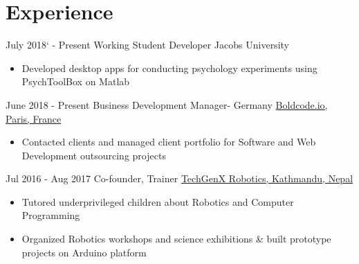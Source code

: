 \documentclass[letterpaper]{twentysecondcv} %
\begin{document}

\section{Experience}

\begin{twenty} %

 \twentyitem
    	{July 2018` -}
		{Present}
        {Working Student Developer}
        {Jacobs University}
        {}
        {\begin{itemize}
        \item Developed  desktop apps for conducting psychology experiments using PsychToolBox on Matlab
        \end{itemize}}
        
    \twentyitem
   		{June 2018 -}
		{Present}
        {Business Development Manager- Germany}
        {\href{http://www.boldcode.io}{Boldcode.io, Paris, France}}
        {}
        {
        {\begin{itemize}
        \item Contacted clients and managed client portfolio for Software and Web Development outsourcing projects
    \end{itemize}}
        }
        
        \twentyitem
   		{Jul 2016 -}
		{Aug 2017}
        {Co-founder, Trainer}
        {\href{https://techgenxblog.wordpress.com}{TechGenX Robotics, Kathmandu, Nepal}}
        {}
        {
        {\begin{itemize}
        \item Tutored underprivileged children about Robotics and Computer Programming
        \item Organized Robotics workshops and science exhibitions \& built prototype projects on Arduino platform
    \end{itemize}}
        }
        
   

\end{twenty}
\end{document}
